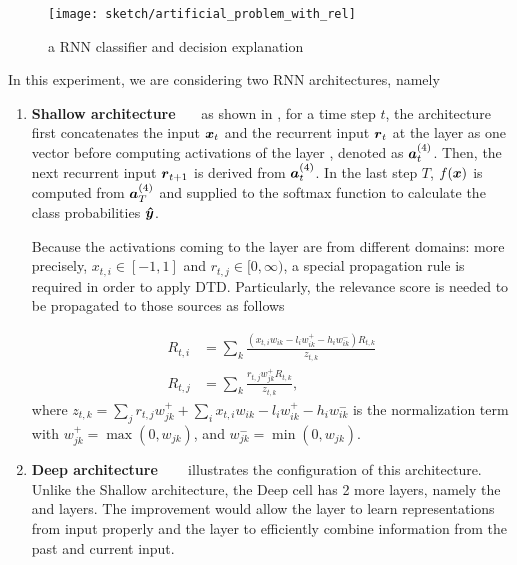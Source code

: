  \begin{figure}[!hbt]
		\centering
		\texttt{[image: sketch/artificial\_problem\_with\_rel]}
		\caption{a RNN classifier and decision explanation} 
		\label{fig:artificial_problem}
\end{figure}


\begin{figure}[!htb]
\centering

     \hfill
{}
\end{figure}

In this experiment, we are considering two RNN architectures, namely

\begin{enumerate}
	\item \textbf{Shallow architecture}  \ \ \ as shown in \addfigure{\ref{fig:shallow_arch}}, for a time step $t$, the  architecture first concatenates the input $\patvector{x}_t$  and the recurrent input $\patvector{r}_t$ at the layer  as one vector before computing activations of the layer , denoted as $\patvector{a}_t^{(4)}$. Then,  the next recurrent input $\patvector{r}_{t+1}$ 	 is derived from $\patvector{a}_t^{(4)}$. In the last step $T$, $f(\boldsymbol{x})$ is computed from $\patvector{a}^{(4)}_{T}$ and supplied to the softmax function to calculate the class probabilities $\patvector{\hat{y}}$. 
		
Because the activations coming to the layer  are from different domains: more precisely, $x_{t,i} \in [-1, 1]$ and $r_{t,j} \in [0, \infty) $, a special propagation rule is required in order to apply DTD. Particularly, the relevance score is needed to be propagated to those sources as follows
		
\begin{align*}
	R_{t, i} &= \sum_k \frac{(x_{t, i} w_{ik} - l_i w_{ik}^+ - h_i w_{ik}^-) R_{t,k}}{z_{t,k}} \\	
     R_{t, j} &= \sum_k \frac{r_{t, j} w_{jk}^+ R_{t,k}}{z_{t,k}},
\end{align*}
where $z_{t,k} = \sum_j r_{t,j} w_{jk}^+ + \sum_i x_{t,i} w_{ik} - l_i w_{ik}^+ - h_i w_{ik}^-$ is the normalization term with $w_{jk}^+ = \max(0, w_{jk})$, and $w_{jk}^- = \min(0, w_{jk})$.

	\item \textbf{Deep architecture} \ \ \ \addfigure{\ref{fig:deep_arch}} illustrates the configuration of this architecture. Unlike the Shallow architecture, the Deep cell has 2 more layers, namely the  and  layers.  The improvement would allow the  layer to learn representations from input properly and the  layer to efficiently combine information from the past and current input. 
\end{enumerate}

